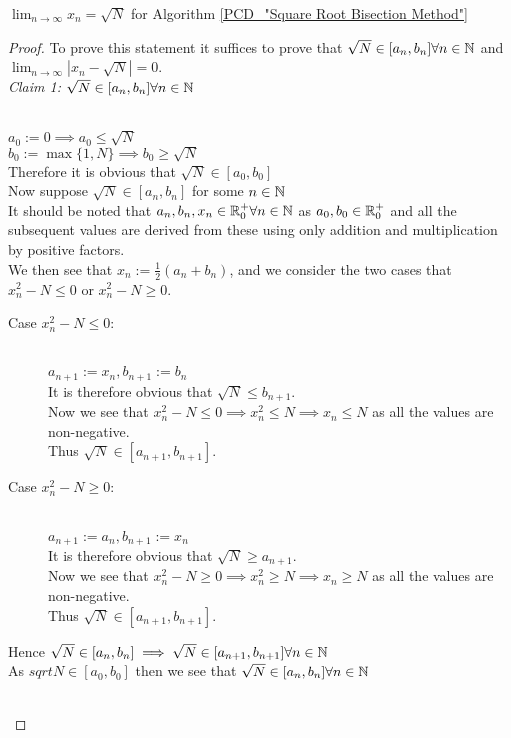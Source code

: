 \begin{Bisection Converges}
\label{THM_"Bisecton Converges"}
\(\lim_{n \to \infty} x_n = \sqrt{N}\) for Algorithm \ref{PCD_"Square Root Bisection Method"}
\end{Bisection Converges}
\begin{proof}
To prove this statement it suffices to prove that \(\sqrt{N} \in [a_n, b_n] \forall n \in \mathbb{N}\) and \(\lim_{n\to\infty} |x_n - \sqrt{N}| = 0\).\\

\textit{Claim 1:} \(\sqrt{N} \in [a_n, b_n] \forall n \in \mathbb{N}\)
\begin{subproof}\\
\(a_0 := 0 \implies a_0 \le \sqrt{N}\)\\
\(b_0 := \max\{1, N\} \implies b_0 \ge \sqrt{N}\)\\
Therefore it is obvious that \(\sqrt{N} \in [a_0, b_0]\)\\
Now suppose \(\sqrt{N} \in [a_n, b_n]\) for some \(n \in \mathbb{N}\)\\
It should be noted that \(a_n, b_n, x_n \in \mathbb{R}^+_0 \forall n \in \mathbb{N}\) as \(a_0, b_0 \in \mathbb{R}^+_0\) and all the subsequent values are derived from these using only addition and multiplication by positive factors.\\
We then see that \(x_n := \frac{1}{2}(a_n + b_n)\), and we consider the two cases that \(x_n^2 - N \le 0\) or \(x_n^2 - N \ge 0\).\\
\begin{description}
\item[Case \(x_n^2 - N \le 0\):]\\
	\(a_{n+1} := x_n, b_{n+1} := b_n\)\\
	It is therefore obvious that \(\sqrt{N} \le b_{n+1}\).\\
	Now we see that \(x_n^2 - N \le 0 \implies x_n^2 \le N \implies x_n \le N\) as all the values are non-negative.\\
	Thus \(\sqrt{N} \in [a_{n+1}, b_{n+1}]\).\\
\item[Case \(x_n^2 - N \ge 0\):]\\
	\(a_{n+1} := a_n, b_{n+1} := x_n\)\\
	It is therefore obvious that \(\sqrt{N} \ge a_{n+1}\).\\
	Now we see that \(x_n^2 - N \ge 0 \implies x_n^2 \ge N \implies x_n \ge N\) as all the values are non-negative.\\
	Thus \(\sqrt{N} \in [a_{n+1}, b_{n+1}]\).\\
\end{description}
Hence \(\sqrt{N} \in [a_n, b_n] \implies \sqrt{N} \in [a_{n+1}, b_{n+1}] \forall n \in \mathbb{N}\)\\
As \(sqrt{N} \in [a_0, b_0]\) then we see that \(\sqrt{N} \in [a_n, b_n] \forall n \in \mathbb{N}\)
\end{subproof}\\


\end{proof}
